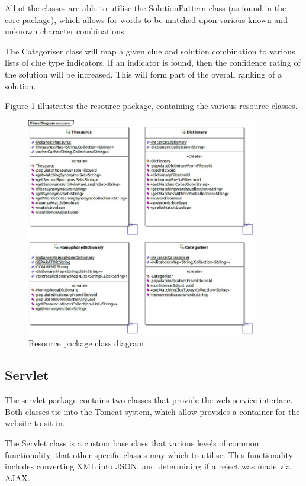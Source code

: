 All of the classes are able to utilise the SolutionPattern class (as found in 
the core package), which allows for words to be matched upon various known and 
unknown character combinations.

The Categoriser class will map a given clue and solution combination to various 
lists of clue type indicators. If an indicator is found, then the confidence 
rating of the solution will be increased. This will form part of the overall 
ranking of a solution.

Figure \ref{fig:resource_package} illustrates the resource package, containing 
the various resource classes.

\begin{figure}[H]
  \centering
  \includegraphics[width=0.9\textwidth]{class/resource.jpg}
  \caption{Resource package class diagram}
  \label{fig:resource_package}
\end{figure}


\subsection{Servlet}
\label{sub:servlet}

The servlet package contains two classes that provide the web service interface.
Both classes tie into the Tomcat system, which allow provides a container for 
the website to sit in. 

The Servlet class is a custom base class that various levels of common 
functionality, that other specific classes may which to utilise. This 
functionality includes converting XML into JSON, and determining if a reject was
made via AJAX.

